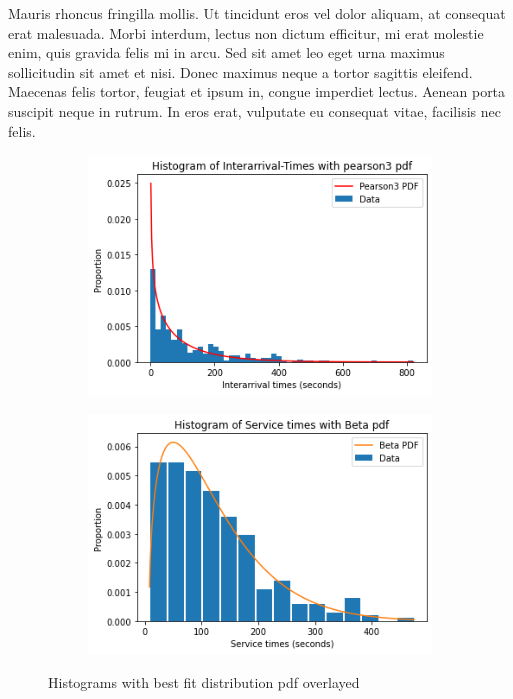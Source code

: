 \documentclass{article}
\begin{document}
Mauris rhoncus fringilla mollis. Ut tincidunt eros vel dolor aliquam, at consequat erat malesuada. Morbi interdum, lectus non dictum efficitur, mi erat molestie enim, quis gravida felis mi in arcu. Sed sit amet leo eget urna maximus sollicitudin sit amet et nisi. Donec maximus neque a tortor sagittis eleifend. Maecenas felis tortor, feugiat et ipsum in, congue imperdiet lectus. Aenean porta suscipit neque in rutrum. In eros erat, vulputate eu consequat vitae, facilisis nec felis.

\begin{figure}[h]
    \centering
    \begin{subfigure}[b]{0.45\textwidth}
        \centering
        \includegraphics[width=\textwidth]{fig3.png}
        \caption{}
        \label{fig:img3}
    \end{subfigure}
    \hfill
    \begin{subfigure}[b]{0.45\textwidth}
        \centering
        \includegraphics[width=\textwidth]{fig4.png}
        \caption{}
        \label{fig:img4}
    \end{subfigure}

    \caption{Histograms with best fit distribution pdf overlayed}
    \label{fig:two-figs2}
\end{figure}
\end{document}

